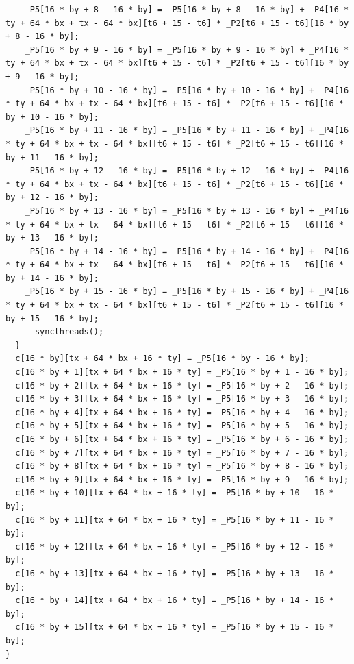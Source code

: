 \documentclass[msthesis,justified,copyright,final,numbers,sort&compress,
gsmodern,amstex,natbib]{uothesis}
\begin{document}
\begin{lstlisting}
    _P5[16 * by + 8 - 16 * by] = _P5[16 * by + 8 - 16 * by] + _P4[16 * ty + 64 * bx + tx - 64 * bx][t6 + 15 - t6] * _P2[t6 + 15 - t6][16 * by + 8 - 16 * by];
    _P5[16 * by + 9 - 16 * by] = _P5[16 * by + 9 - 16 * by] + _P4[16 * ty + 64 * bx + tx - 64 * bx][t6 + 15 - t6] * _P2[t6 + 15 - t6][16 * by + 9 - 16 * by];
    _P5[16 * by + 10 - 16 * by] = _P5[16 * by + 10 - 16 * by] + _P4[16 * ty + 64 * bx + tx - 64 * bx][t6 + 15 - t6] * _P2[t6 + 15 - t6][16 * by + 10 - 16 * by];
    _P5[16 * by + 11 - 16 * by] = _P5[16 * by + 11 - 16 * by] + _P4[16 * ty + 64 * bx + tx - 64 * bx][t6 + 15 - t6] * _P2[t6 + 15 - t6][16 * by + 11 - 16 * by];
    _P5[16 * by + 12 - 16 * by] = _P5[16 * by + 12 - 16 * by] + _P4[16 * ty + 64 * bx + tx - 64 * bx][t6 + 15 - t6] * _P2[t6 + 15 - t6][16 * by + 12 - 16 * by];
    _P5[16 * by + 13 - 16 * by] = _P5[16 * by + 13 - 16 * by] + _P4[16 * ty + 64 * bx + tx - 64 * bx][t6 + 15 - t6] * _P2[t6 + 15 - t6][16 * by + 13 - 16 * by];
    _P5[16 * by + 14 - 16 * by] = _P5[16 * by + 14 - 16 * by] + _P4[16 * ty + 64 * bx + tx - 64 * bx][t6 + 15 - t6] * _P2[t6 + 15 - t6][16 * by + 14 - 16 * by];
    _P5[16 * by + 15 - 16 * by] = _P5[16 * by + 15 - 16 * by] + _P4[16 * ty + 64 * bx + tx - 64 * bx][t6 + 15 - t6] * _P2[t6 + 15 - t6][16 * by + 15 - 16 * by];
    __syncthreads();
  }
  c[16 * by][tx + 64 * bx + 16 * ty] = _P5[16 * by - 16 * by];
  c[16 * by + 1][tx + 64 * bx + 16 * ty] = _P5[16 * by + 1 - 16 * by];
  c[16 * by + 2][tx + 64 * bx + 16 * ty] = _P5[16 * by + 2 - 16 * by];
  c[16 * by + 3][tx + 64 * bx + 16 * ty] = _P5[16 * by + 3 - 16 * by];
  c[16 * by + 4][tx + 64 * bx + 16 * ty] = _P5[16 * by + 4 - 16 * by];
  c[16 * by + 5][tx + 64 * bx + 16 * ty] = _P5[16 * by + 5 - 16 * by];
  c[16 * by + 6][tx + 64 * bx + 16 * ty] = _P5[16 * by + 6 - 16 * by];
  c[16 * by + 7][tx + 64 * bx + 16 * ty] = _P5[16 * by + 7 - 16 * by];
  c[16 * by + 8][tx + 64 * bx + 16 * ty] = _P5[16 * by + 8 - 16 * by];
  c[16 * by + 9][tx + 64 * bx + 16 * ty] = _P5[16 * by + 9 - 16 * by];
  c[16 * by + 10][tx + 64 * bx + 16 * ty] = _P5[16 * by + 10 - 16 * by];
  c[16 * by + 11][tx + 64 * bx + 16 * ty] = _P5[16 * by + 11 - 16 * by];
  c[16 * by + 12][tx + 64 * bx + 16 * ty] = _P5[16 * by + 12 - 16 * by];
  c[16 * by + 13][tx + 64 * bx + 16 * ty] = _P5[16 * by + 13 - 16 * by];
  c[16 * by + 14][tx + 64 * bx + 16 * ty] = _P5[16 * by + 14 - 16 * by];
  c[16 * by + 15][tx + 64 * bx + 16 * ty] = _P5[16 * by + 15 - 16 * by];
}
\end{lstlisting}



\end{document}
